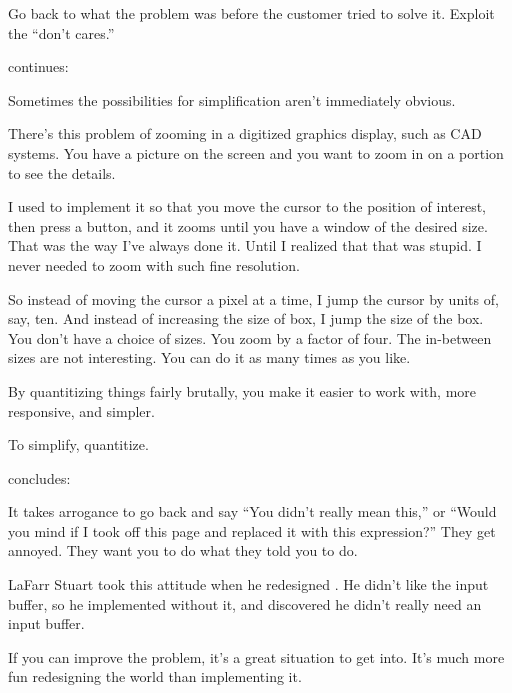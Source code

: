 \begin{tip}
Go back to what the problem was before the customer tried to solve it.
Exploit the ``don't cares.''
\end{tip}




\begin{interview}
 continues:

\begin{tfquot}
Sometimes the possibilities for simplification aren't immediately
obvious.

There's this problem of zooming in a digitized graphics display, such
as CAD systems. You have a picture on the screen and you want to zoom
in on a portion to see the details.

I used to implement it so that you move the cursor to the position of
interest, then press a button, and it zooms until you have a window of
the desired size. That was the way I've always done it. Until I
realized that that was stupid. I never needed to zoom with such fine
resolution.

So instead of moving the cursor a pixel at a time, I jump the cursor
by units of, say, ten. And instead of increasing the size of box, I
jump the size of the box. You don't have a choice of sizes. You zoom
by a factor of four. The in-between sizes are not interesting. You can
do it as many times as you like.

By quantitizing things fairly brutally, you make it easier to work with,
more responsive, and simpler.
\end{tfquot}
\end{interview}

\begin{tip}
To simplify, quantitize.
\end{tip}

\begin{interview}
 concludes:
\begin{tfquot}
It takes arrogance to go back and say ``You didn't really mean this,''
or ``Would you mind if I took off this page and replaced it with this
expression?'' They get annoyed. They want you to do what they told you
to do.

LaFarr Stuart took this attitude when he redesigned \Forth{}
\cite{stuart80}. He didn't like the input buffer, so he implemented
\Forth{} without it, and discovered he didn't really need an input buffer.

If you can improve the problem, it's a great situation to get into.
It's much more fun redesigning the world than implementing it.
\end{tfquot}
\end{interview}

